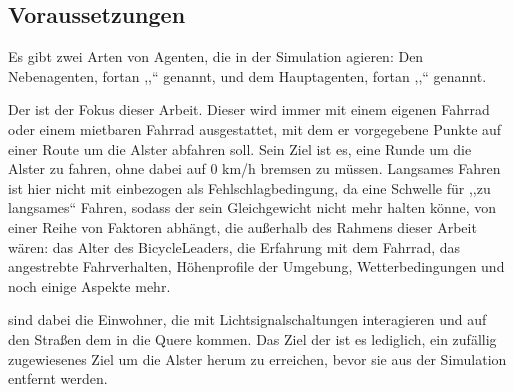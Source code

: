 %

\subsection{Voraussetzungen}\label{subsec:prerequisities}

Es gibt zwei Arten von Agenten, die in der Simulation agieren: Den Nebenagenten, fortan ,,`` genannt, und dem Hauptagenten, fortan ,,`` genannt.

Der  ist der Fokus dieser Arbeit.
Dieser wird immer mit einem eigenen Fahrrad oder einem mietbaren Fahrrad ausgestattet, mit dem er vorgegebene Punkte auf einer Route um die Alster abfahren soll.
Sein Ziel ist es, eine Runde um die Alster zu fahren, ohne dabei auf 0 km/h bremsen zu müssen.
Langsames Fahren ist hier nicht mit einbezogen als Fehlschlagbedingung, da eine Schwelle für ,,zu langsames`` Fahren, sodass der  sein Gleichgewicht nicht mehr halten könne, von einer Reihe von Faktoren abhängt, die außerhalb des Rahmens dieser Arbeit wären: das Alter des BicycleLeaders, die Erfahrung mit dem Fahrrad, das angestrebte Fahrverhalten, Höhenprofile der Umgebung, Wetterbedingungen und noch einige Aspekte mehr.

 sind dabei die Einwohner, die mit Lichtsignalschaltungen interagieren und auf den Straßen dem  in die Quere kommen.
Das Ziel der  ist es lediglich, ein zufällig zugewiesenes Ziel um die Alster herum zu erreichen, bevor sie aus der Simulation entfernt werden.
